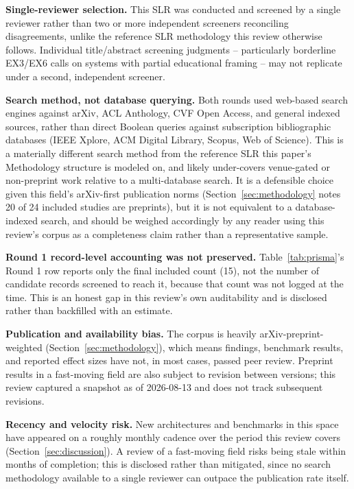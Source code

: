 \documentclass[journal]{IEEEtran}
\begin{document}
\textbf{Single-reviewer selection.} This SLR was conducted and screened by a single reviewer rather than two or more independent screeners reconciling disagreements, unlike the reference SLR methodology this review otherwise follows. Individual title/abstract screening judgments -- particularly borderline EX3/EX6 calls on systems with partial educational framing -- may not replicate under a second, independent screener.

\textbf{Search method, not database querying.} Both rounds used web-based search engines against arXiv, ACL Anthology, CVF Open Access, and general indexed sources, rather than direct Boolean queries against subscription bibliographic databases (IEEE Xplore, ACM Digital Library, Scopus, Web of Science). This is a materially different search method from the reference SLR this paper's Methodology structure is modeled on, and likely under-covers venue-gated or non-preprint work relative to a multi-database search. It is a defensible choice given this field's arXiv-first publication norms (Section~\ref{sec:methodology} notes 20 of 24 included studies are preprints), but it is not equivalent to a database-indexed search, and should be weighed accordingly by any reader using this review's corpus as a completeness claim rather than a representative sample.

\textbf{Round 1 record-level accounting was not preserved.} Table~\ref{tab:prisma}'s Round 1 row reports only the final included count (15), not the number of candidate records screened to reach it, because that count was not logged at the time. This is an honest gap in this review's own auditability and is disclosed rather than backfilled with an estimate.

\textbf{Publication and availability bias.} The corpus is heavily arXiv-preprint-weighted (Section~\ref{sec:methodology}), which means findings, benchmark results, and reported effect sizes have not, in most cases, passed peer review. Preprint results in a fast-moving field are also subject to revision between versions; this review captured a snapshot as of 2026-08-13 and does not track subsequent revisions.

\textbf{Recency and velocity risk.} New architectures and benchmarks in this space have appeared on a roughly monthly cadence over the period this review covers (Section~\ref{sec:discussion}). A review of a fast-moving field risks being stale within months of completion; this is disclosed rather than mitigated, since no search methodology available to a single reviewer can outpace the publication rate itself.
\end{document}
